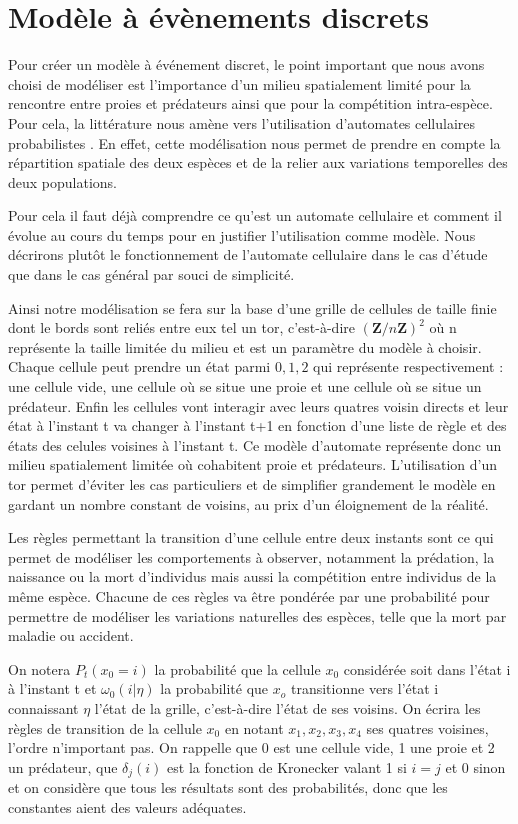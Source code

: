 \chapter{Modèle à évènements discrets}
\label{chapitre:etat_discret}

Pour créer un modèle à événement discret, le point important que nous avons choisi de modéliser est l'importance d'un milieu spatialement limité pour la rencontre entre proies et prédateurs ainsi que pour la compétition intra-espèce. Pour cela, la littérature nous amène vers l'utilisation d'automates cellulaires probabilistes \cite{Carvalho} . En effet, cette modélisation nous permet de prendre en compte la répartition spatiale des deux espèces et de la relier aux variations temporelles des deux populations. 


Pour cela il faut déjà comprendre ce qu'est un automate cellulaire et comment il évolue au cours du temps pour en justifier l'utilisation comme modèle. Nous décrirons plutôt le fonctionnement de l'automate cellulaire dans le cas d'étude que dans le cas général par souci de simplicité.


Ainsi notre modélisation se fera sur la base d'une grille de cellules de taille finie dont le bords sont reliés entre eux tel un tor, c'est-à-dire ${(\mathbf{Z}/n\mathbf{Z})^2}$ où n représente la taille limitée du milieu et est un paramètre du modèle à choisir. Chaque cellule peut prendre un état parmi ${0,1,2}$ qui représente respectivement : une cellule vide, une cellule où se situe une proie et une cellule où se situe un prédateur. Enfin les cellules vont interagir avec leurs quatres voisin directs et leur état à l'instant t va changer à l'instant t+1 en fonction d'une liste de règle et des états des celules voisines à l'instant t. Ce modèle d'automate représente donc un milieu spatialement limitée où cohabitent proie et prédateurs. L'utilisation d'un tor permet d'éviter les cas particuliers et de simplifier grandement le modèle en gardant un nombre constant de voisins, au prix d'un éloignement de la réalité.


Les règles permettant la transition d'une cellule entre deux instants sont ce qui permet de modéliser les comportements à observer, notamment la prédation, la naissance ou la mort d'individus mais aussi la compétition entre individus de la même espèce. Chacune de ces règles va être pondérée par une probabilité pour permettre de modéliser les variations naturelles des espèces, telle que la mort par maladie ou accident.


On notera $ P_{t}(x_0=i)$ la probabilité que la cellule $x_0$ considérée soit dans l'état i à l'instant t et $\omega_0(i|\eta)$ la probabilité que $x_o$ transitionne vers l'état i connaissant $\eta$ l'état de la grille, c'est-à-dire l'état de ses voisins. On écrira les règles de transition de la cellule $x_0$ en notant $x_1, x_2, x_3, x_4$ ses quatres voisines, l'ordre n'important pas. On rappelle que 0 est une cellule vide, 1 une proie et 2 un prédateur, que $\delta_{j}(i)$ est la fonction de Kronecker valant 1 si $i=j$ et 0 sinon et on considère que tous les résultats sont des probabilités, donc que les constantes aient des valeurs adéquates.


